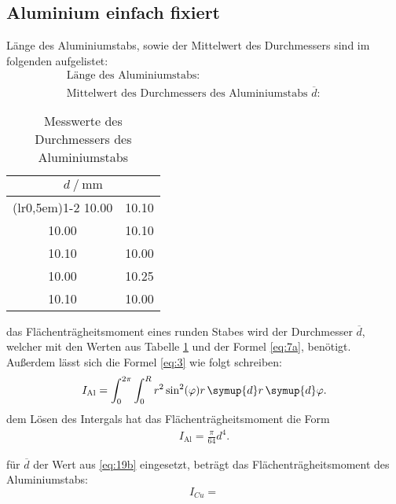 \subsection{Aluminium einfach fixiert}\label{sec:4.3}

\justifying Länge des Aluminiumstabs, sowie der Mittelwert des Durchmessers sind im folgenden aufgelistet:
\begin{subequations}\label{eq:19}
\begin{align}
    &\text{Länge des Aluminiumstabs:} \qquad &\text{} \label{eq:19a}\\
    &\text{Mittelwert des Durchmessers des Aluminiumstabs $\overline{d}$:} \qquad &\text{} \label{eq:19b}
\end{align}
\end{subequations}

\begin{table}[H]
\centering
    \begin{tabular}{c c}
    \toprule
        \multicolumn{2}{c}{$d \:/\: \si{\milli\meter}$}\\
        \cmidrule(lr{0,5em}){1-2}
        10.00 & 10.10\\
        10.00 & 10.10\\
        10.10 & 10.00\\
        10.00 & 10.25\\
        10.10 & 10.00\\
        \bottomrule
    \end{tabular}
\caption{Messwerte des Durchmessers des Aluminiumstabs}
\label{tab:4}
\end{table}

\justifying das Flächenträgheitsmoment eines runden Stabes wird der Durchmesser $\overline{d}$, welcher mit den Werten aus Tabelle
\ref{tab:4} und der Formel \eqref{eq:7a}, benötigt. Außerdem lässt sich die Formel \eqref{eq:3} 
wie folgt schreiben:
\begin{align}
    I_{\text{Al}}=\int_{0}^{2\pi} \int_{0}^{R} r^2 \sin^2(\varphi) r \, \symup{d}r \, \symup{d}\varphi \label{eq:20}.
\end{align}
\justifying  dem Lösen des Intergals hat das Flächenträgheitsmoment die Form
\begin{align}
     I_{\text{Al}}=\frac{\pi}{64} d^4. \label{eq:21}
\end{align}

\justifying für $\overline{d}$ der Wert aus \eqref{eq:19b} eingesetzt, beträgt das Flächenträgheitsmoment des Aluminiumstabs:
\begin{equation}
I_{Cu} = \text{} \label{eq:22}
\end{equation}

